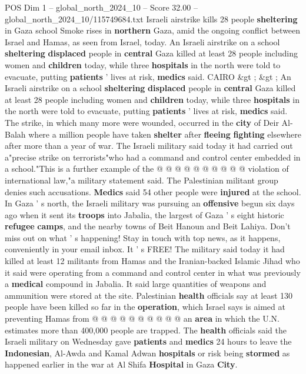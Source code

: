 \begin{textsample}{POS Dim 1 – global\_north\_2024\_10 – Score 32.00 – global\_north\_2024\_10/115749684.txt}  \label{ex:f1_pos_374}
Israeli airstrike kills 28 people \textbf{sheltering} in Gaza school Smoke rises in \textbf{northern} Gaza, amid the ongoing conflict between Israel and Hamas, as seen from Israel, today.
An Israeli airstrike on a school \textbf{sheltering} \textbf{displaced} people in \textbf{central} Gaza killed at least 28 people including women and \textbf{children} today, while three \textbf{hospitals} in the north were told to evacuate, putting \textbf{patients} ' lives at risk, \textbf{medics} said.
CAIRO \&gt ; \&gt ; An Israeli airstrike on a school \textbf{sheltering} \textbf{displaced} people in \textbf{central} Gaza killed at least 28 people including women and \textbf{children} today, while three \textbf{hospitals} in the north were told to evacuate, putting \textbf{patients} ' lives at risk, \textbf{medics} said.
The strike, in which many more were wounded, occurred in the \textbf{city} of Deir Al-Balah where a million people have taken \textbf{shelter} after \textbf{fleeing} \textbf{fighting} elsewhere after more than a year of war.
The Israeli military said today it had carried out a"precise strike on terrorists"who had a command and control center embedded in a school."This is a further example of the @ @ @ @ @ @ @ @ @ @ violation of international law,"a military statement said.
The Palestinian militant group denies such accusations. \textbf{Medics} said 54 other people were \textbf{injured} at the school.
In Gaza ' s north, the Israeli military was pursuing an \textbf{offensive} begun six days ago when it sent its \textbf{troops} into Jabalia, the largest of Gaza ' s eight historic \textbf{refugee} \textbf{camps}, and the nearby towns of Beit Hanoun and Beit Lahiya.
Don't miss out on what ' s happening!
Stay in touch with top news, as it happens, conveniently in your email inbox.
It ' s FREE!
The military said today it had killed at least 12 militants from Hamas and the Iranian-backed Islamic Jihad who it said were operating from a command and control center in what was previously a \textbf{medical} compound in Jabalia.
It said large quantities of weapons and ammunition were stored at the site.
Palestinian \textbf{health} officials say at least 130 people have been killed so far in the \textbf{operation}, which Israel says is aimed at preventing Hamas from @ @ @ @ @ @ @ @ @ @ an \textbf{area} in which the U.N. estimates more than 400,000 people are trapped.
The \textbf{health} officials said the Israeli military on Wednesday gave \textbf{patients} and \textbf{medics} 24 hours to leave the \textbf{Indonesian}, Al-Awda and Kamal Adwan \textbf{hospitals} or risk being \textbf{stormed} as happened earlier in the war at Al Shifa \textbf{Hospital} in Gaza \textbf{City}.

\end{textsample}
